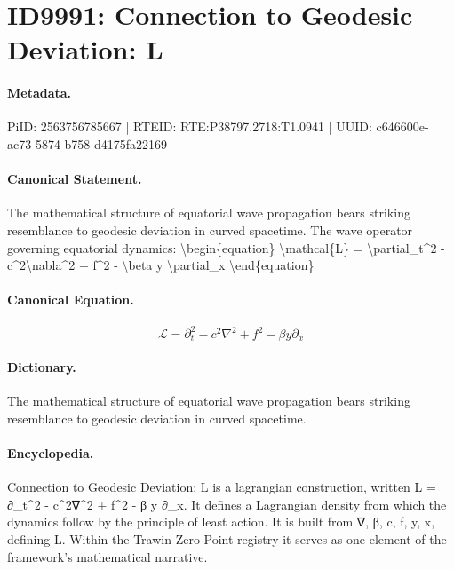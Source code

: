 \section*{ID9991: Connection to Geodesic Deviation: L}
\paragraph{Metadata.}
PiID: 2563756785667 | RTEID: RTE:P38797.2718:T1.0941 | UUID: c646600e-ac73-5874-b758-d4175fa22169

\paragraph{Canonical Statement.}
The mathematical structure of equatorial wave propagation bears striking resemblance to geodesic deviation in curved spacetime. The wave operator governing equatorial dynamics: \textbackslash{}begin\{equation\} \textbackslash{}mathcal\{L\} = \textbackslash{}partial\_t\textasciicircum{}2 - c\textasciicircum{}2\textbackslash{}nabla\textasciicircum{}2 + f\textasciicircum{}2 - \textbackslash{}beta y \textbackslash{}partial\_x \textbackslash{}end\{equation\}

\paragraph{Canonical Equation.}
\[
\mathcal{L} = \partial_t^2 - c^2\nabla^2 + f^2 - \beta y \partial_x
\]

\paragraph{Dictionary.}
The mathematical structure of equatorial wave propagation bears striking resemblance to geodesic deviation in curved spacetime.

\paragraph{Encyclopedia.}
Connection to Geodesic Deviation: L is a lagrangian construction, written L = ∂\_t\textasciicircum{}2 - c\textasciicircum{}2∇\textasciicircum{}2 + f\textasciicircum{}2 - β y ∂\_x. It defines a Lagrangian density from which the dynamics follow by the principle of least action. It is built from ∇, β, c, f, y, x, defining L. Within the Trawin Zero Point registry it serves as one element of the framework's mathematical narrative.
